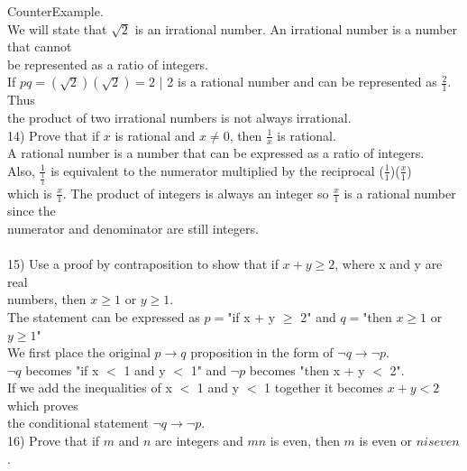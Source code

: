 \documentclass{article}
\begin{document}
\begin{flushleft}
CounterExample.\\
\setlength\parindent{24pt} We will state that $\sqrt{2}$ is an irrational number.  An irrational number is a number that cannot \\
be represented as a ratio of integers. \\
\setlength\parindent{24pt} If $pq = (\sqrt{2})(\sqrt{2}) = 2$  | 2 is a rational number and can be represented as $\frac{2}{1}$.  Thus \\
the product of two irrational numbers is not always irrational. \\

\setlength\parindent{0pt}14) Prove that if $x$ is rational and $x \neq 0$, then $\frac{1}{x}$ is rational. \\
\setlength\parindent{24pt} A rational number is a number that can be expressed as a ratio of integers. \\
\setlength\parindent{24pt} Also, $\frac{1}{\frac{1}{x}}$ is equivalent to the numerator multiplied by the reciprocal ($\frac{1}{1}$)($\frac{x}{1}$) \\
\setlength\parindent{24pt} which is $\frac{x}{1}$.  The product of integers is always an integer so $\frac{x}{1}$ is a rational number since the \\
numerator and denominator are still integers. \\
~\\
\setlength\parindent{0pt}15) Use a proof by contraposition to show that if $x + y \geq 2$, where x and y are real \\numbers, then $x \geq 1$ or $y \geq 1$. \\
\setlength\parindent{24pt}The statement can be expressed as $p = $"if x + y $\geq$ 2" and $q = $"then $x \geq 1$ or $y \geq 1$"\\
\setlength\parindent{24pt} We first place the original $p \rightarrow q$ proposition in the form of $\neg q \rightarrow \neg p$.  \\
\setlength\parindent{24pt}$\neg q$ becomes "if x $<$ 1 and y $<$ 1" and $\neg p$ becomes "then x + y $<$ 2". \\
\setlength\parindent{24pt} If we add the inequalities of x $<$ 1 and y $<$ 1 together it becomes $x + y < 2$ which proves \\
the conditional statement $\neg q \rightarrow \neg p$. \\
\setlength\parindent{0pt}16) Prove that if $m$ and $n$ are integers and $mn$ is even, then $m$ is even or $n is even$. \\

\end{flushleft}
\end{document}
